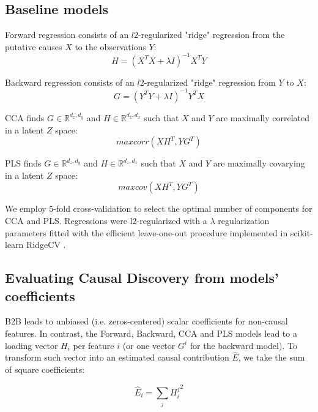 \subsection{Baseline models}

Forward regression consists of an $l2$-regularized "ridge" regression from the
putative causes $X$ to the observations $Y$: \begin{equation} H = (X^T X
+\lambda I)^{-1} X^T Y \end{equation}

Backward regression consists of an $l2$-regularized "ridge" regression from $Y$
to $X$: \begin{equation} G = (Y^T Y +\lambda I)^{-1} Y^T X \end{equation}

CCA finds $G\in\mathbb{R}^{d_z, d_y}$ and $H\in\mathbb{R}^{d_z, d_x}$ such that
$X$ and $Y$ are maximally correlated in a latent $Z$ space: \begin{equation} max
corr(XH^T, YG^T) \end{equation}

PLS finds $G\in\mathbb{R}^{d_z, d_y}$ and $H\in\mathbb{R}^{d_z, d_x}$ such that
$X$ and $Y$ are maximally covarying in a latent $Z$ space: \begin{equation} max
cov(XH^T, YG^T) \end{equation}

We employ $5$-fold cross-validation to select the optimal number of components
for CCA and PLS. Regressions were l2-regularized with a $\lambda$ regularization
parameters fitted with the efficient leave-one-out procedure implemented in
scikit-learn RidgeCV \citep{scikit}.

\subsection{Evaluating Causal Discovery from models' coefficients}

B2B leads to unbiased (i.e. zeros-centered) scalar coefficients for non-causal
features. In contrast, the Forward, Backward, CCA and PLS models lead to a
loading vector $H_i$ per feature $i$ (or one vector $G^i$ for the backward
model). To transform such vector into an estimated causal contribution $\hat E$,
we take the sum of square coefficients:

\begin{equation} \hat E_i = \sum_j {H^j_i}^2 \end{equation}

